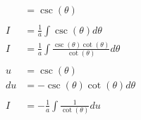 \documentclass[12pt]{article}
\begin{document}
\begin{align}
                                                           & = \csc(\theta)                                                                                                                                                \\
    \nonumber                                                                                                                                                                                                              \\
    I                                                      & = \frac{1}{a} \int \csc(\theta) d\theta                                                                                                                       \\
    I                                                      & = \frac{1}{a} \int \frac{\csc(\theta)\cot(\theta)}{\cot(\theta)} d\theta                                                                                      \\
    \nonumber                                                                                                                                                                                                              \\
    u                                                      & = \csc(\theta)                                                                                                                                                \\
    du                                                     & = -\csc(\theta)\cot(\theta) d\theta                                                                                                                           \\
    \nonumber                                                                                                                                                                                                              \\
    I                                                      & = -\frac{1}{a} \int \frac{1}{\cot(\theta)} du                                                                                                                 \\
    \nonumber                                                                                                                                                                                                              \\

\end{align}
\end{document}
